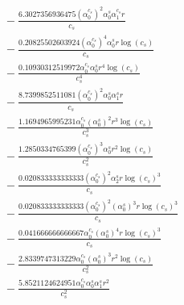 \documentclass[10pt]{article}
\begin{document}
\begin{align*}
&{}  - \frac{6.3027356936475 \left(\alpha_{0}^{c_s}\right)^{2} \alpha_{0}^s \alpha_{1}^{c_s} r}{c_{s}} \\
&{}  - \frac{0.20825502603924 \left(\alpha_{0}^{c_s}\right)^{4} \alpha_{0}^s r \log{\left(c_{s} \right)}}{c_{s}} \\
&{}  - \frac{0.10930312519972 \alpha_{0}^{c_s} \alpha_{0}^s r^{4} \log{\left(c_{s} \right)}}{c_{s}^{4}} \\
&{}  - \frac{8.7399852511081 \left(\alpha_{0}^{c_s}\right)^{2} \alpha_{0}^s \alpha_{1}^s r}{c_{s}} \\
&{}  - \frac{1.1694965995231 \alpha_{0}^{c_s} \left(\alpha_{0}^s\right)^{2} r^{3} \log{\left(c_{s} \right)}}{c_{s}^{3}} \\
&{}  - \frac{1.2850334765399 \left(\alpha_{0}^{c_s}\right)^{3} \alpha_{0}^s r^{2} \log{\left(c_{s} \right)}}{c_{s}^{2}} \\
&{}  - \frac{0.020833333333333 \left(\alpha_{0}^{c_s}\right)^{2} \alpha_{2}^s r \log{\left(c_{s} \right)}^{3}}{c_{s}} \\
&{}  - \frac{0.020833333333333 \left(\alpha_{0}^{c_s}\right)^{2} \left(\alpha_{0}^s\right)^{3} r \log{\left(c_{s} \right)}^{3}}{c_{s}} \\
&{}  - \frac{0.041666666666667 \alpha_{0}^{c_s} \left(\alpha_{0}^s\right)^{4} r \log{\left(c_{s} \right)}^{3}}{c_{s}} \\
&{}  - \frac{2.8339747313229 \alpha_{0}^{c_s} \left(\alpha_{0}^s\right)^{3} r^{2} \log{\left(c_{s} \right)}}{c_{s}^{2}} \\
&{}  - \frac{5.8521124624951 \alpha_{0}^{c_s} \alpha_{0}^s \alpha_{1}^s r^{2}}{c_{s}^{2}}
\end{align*}
\end{document}
